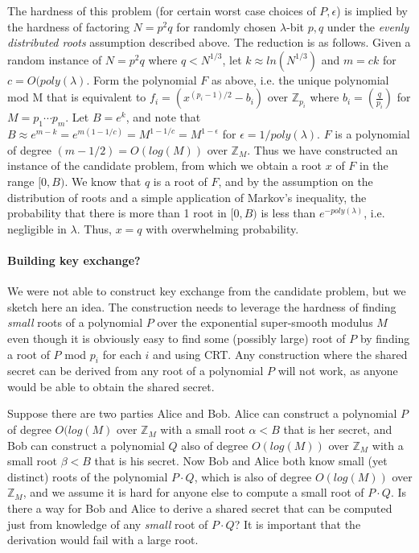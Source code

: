 \documentclass[letterpaper,twocolumn,10pt]{article}
\begin{document}
The hardness of this problem (for certain worst case choices of $P, \epsilon$) is implied by the hardness of factoring $N = p^2 q$ for randomly chosen $\lambda$-bit $p, q$ under the \emph{evenly distributed roots} assumption described above. The reduction is as follows. Given a random instance of $N = p^2 q$ where $q < N^{1/3}$, let $k \approx ln(N^{1/3})$ and $m = c k$ for $c = O(poly(\lambda)$. Form the polynomial $F$ as above, i.e. the unique polynomial mod M that is equivalent to $f_i = (x^{(p_i - 1)/2} - b_i)$ over $\mathbb{Z}_{p_i}$ where $b_i =  \left(\frac{q}{p_i}\right)$ for $M = p_1 \cdots p_m$. Let $B = e^k$, and note that $B \approx e^{m - k} = e^{m(1 - 1/c)} = M^{1 - 1/c} = M^{1- \epsilon}$ for $\epsilon = 1/poly(\lambda)$. $F$ is a polynomial of degree $(m - 1/2) = O(log(M))$ over $\mathbb{Z}_M$. Thus we have constructed an instance of the candidate problem, from which we obtain a root $x$ of $F$ in the range $[0, B)$. We know that $q$ is a root of $F$, and by the assumption on the distribution of roots and a simple application of Markov's inequality, the probability that there is more than 1 root in $[0, B)$ is less than $e^{-poly(\lambda)}$, i.e. negligible in $\lambda$. Thus, $x = q$ with overwhelming probability. 

\paragraph{Building key exchange?} We were not able to construct key exchange from the candidate problem, but we sketch here an idea. The construction needs to leverage the hardness of finding \emph{small} roots of a polynomial $P$ over the exponential super-smooth modulus $M$ even though it is obviously easy to find some (possibly large) root of $P$ by finding a root of $P$ mod $p_i$ for each $i$ and using CRT. Any construction where the shared secret can be derived from any root of a polynomial $P$ will not work, as anyone would be able to obtain the shared secret. 

Suppose there are two parties Alice and Bob. Alice can construct a polynomial $P$ of degree $O(log(M)$ over $\mathbb{Z}_M$ with a small root $\alpha < B$ that is her secret, and Bob can construct a polynomial $Q$ also of degree $O(log(M))$ over $\mathbb{Z}_M$ with a small root $\beta < B$ that is his secret. Now Bob and Alice both know small (yet distinct) roots of the polynomial $P \cdot Q$, which is also of degree $O(log(M))$ over $\mathbb{Z}_M$, and we assume it is hard for anyone else to compute a small root of $P\cdot Q$. Is there a way for Bob and Alice to derive a shared secret that can be computed just from knowledge of any \emph{small} root of $P\cdot Q$? It is important that the derivation would fail with a large root. 
\end{document}
